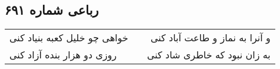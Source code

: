 \begin{center}
\section*{رباعی شماره ۶۹۱}
\label{sec:sh691}
\begin{longtable}{l p{0.5cm} r}
خواهی چو خلیل کعبه بنیاد کنی
&&
و آنرا به نماز و طاعت آباد کنی
\\
روزی دو هزار بنده آزاد کنی
&&
به زان نبود که خاطری شاد کنی
\\
\end{longtable}
\end{center}
